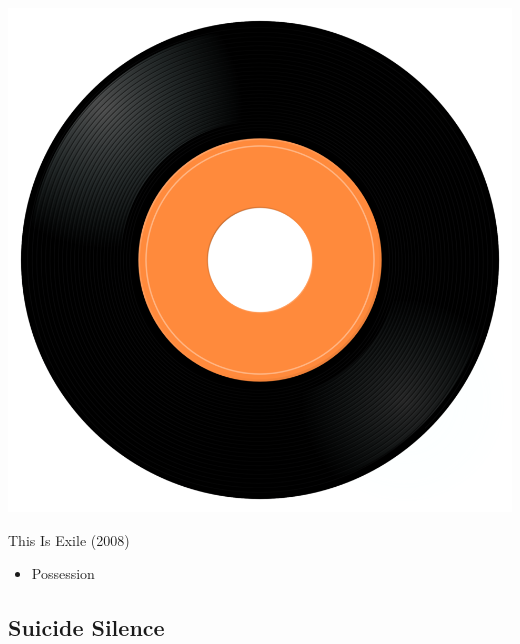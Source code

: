 \begin{minipage}[t]{0.25\textwidth}\vspace{0pt}
\captionsetup{type=figure}
\includegraphics[width=\textwidth]{Images/cover.png}
\caption*{This Is Exile (2008)}
\end{minipage}
\begin{minipage}[t]{0.25\textwidth}\vspace{0pt}
\begin{itemize}[nosep,leftmargin=1em,labelwidth=*,align=left]
	\setlength{\itemsep}{0pt}
	\item Possession 
\end{itemize}
\end{minipage}

\subsection{Suicide Silence}


